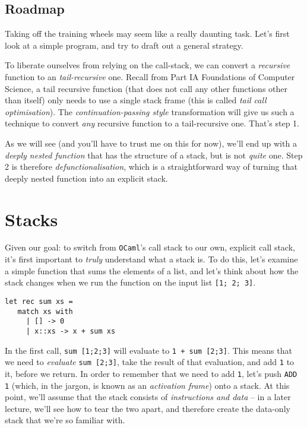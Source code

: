 \subsection{Roadmap}
Taking off the training wheels may seem like a really daunting task. Let's first look at a simple program, and try to draft out a general strategy.

To liberate ourselves from relying on the call-stack, we can convert a \emph{recursive} function to an \emph{tail-recursive} one. Recall from {\sffamily Part IA Foundations of Computer Science}, a tail recursive function (that does not call any other functions other than itself) only needs to use a single stack frame (this is called \emph{tail call optimisation}). The \emph{continuation-passing style} transformation will give us such a technique to convert \emph{any} recursive function to a tail-recursive one. That's step 1.

As we will see (and you'll have to trust me on this for now), we'll end up with a \emph{deeply nested function} that has the structure of a stack, but is not \emph{quite} one. Step 2 is therefore \emph{defunctionalisation}, which is a straightforward way of turning that deeply nested function into an explicit stack. 

\section{Stacks}
Given our goal: to switch from \texttt{OCaml}'s call stack to our own, explicit call stack, it's first important to \emph{truly} understand what a stack is. To do this, let's examine a simple function that sums the elements of a list, and let's think about how the stack changes when we run the function on the input list \texttt{[1; 2; 3]}.

\begin{code}
\label{code:sum-ocaml}
\begin{verbatim}
let rec sum xs = 
   match xs with
     | [] -> 0
     | x::xs -> x + sum xs
\end{verbatim}
\end{code}

In the first call, \texttt{sum [1;2;3]} will evaluate to \texttt{1 + sum [2;3]}. This means that we need to \emph{evaluate} \texttt{sum [2;3]}, take the result of that evaluation, and add \texttt{1} to it, before we return. In order to remember that we need to add \texttt{1}, let's push \texttt{ADD 1} (which, in the jargon, is known as an \emph{activation frame}) onto a stack. At this point, we'll assume that the stack consists of \emph{instructions and data} -- in a later lecture, we'll see how to tear the two apart, and therefore create the data-only stack that we're so familiar with. 

